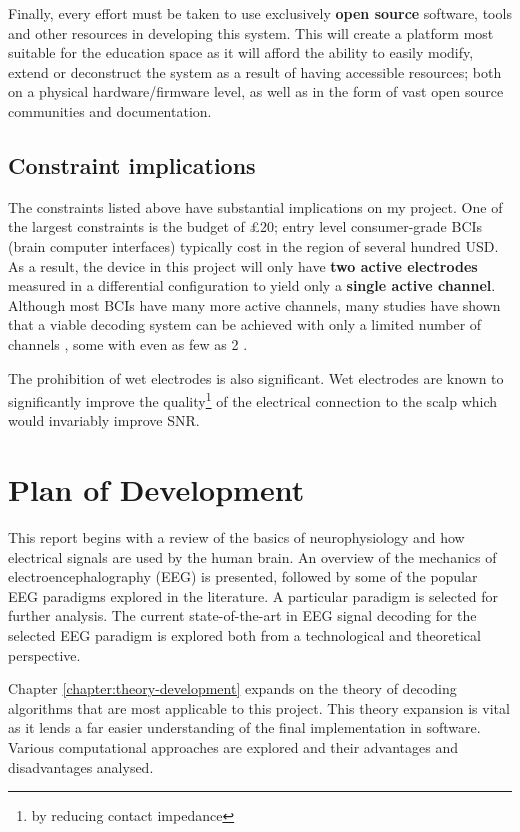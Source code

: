 Finally, every effort must be taken to use exclusively \textbf{open source} software, tools and other resources in developing this system. This will create a platform most suitable for the education space as it will afford the ability to easily modify, extend or deconstruct the system as a result of having accessible resources; both on a physical hardware/firmware level, as well as in the form of vast open source communities and documentation.

\subsection{Constraint implications}
The constraints listed above have substantial implications on my project. One of the largest constraints is the budget of £20; entry level consumer-grade BCIs (brain computer interfaces) typically cost in the region of several hundred USD. As a result, the device in this project will only have \textbf{two active electrodes} measured in a differential configuration to yield only a \textbf{single active channel}. Although most BCIs have many more active channels, many studies have shown that a viable decoding system can be achieved with only a limited number of channels \cite{Wang2011}, some with even as few as 2 \cite{acampora-dataset}. 

The prohibition of wet electrodes is also significant. Wet electrodes are known to significantly improve the quality\footnote{by reducing contact impedance} of the electrical connection to the scalp which would invariably improve SNR. 
\section{Plan of Development}
This report begins with a review of the basics of neurophysiology and how electrical signals are used by the human brain. An overview of the mechanics of electroencephalography (EEG) is presented, followed by some of the popular EEG paradigms explored in the literature. A particular paradigm is selected for further analysis. The current state-of-the-art in EEG signal decoding for the selected EEG paradigm is explored both from a technological and theoretical perspective. 

Chapter \ref{chapter:theory-development} expands on the theory of decoding algorithms that are most applicable to this project. This theory expansion is vital as it lends a far easier understanding of the final implementation in software. Various computational approaches are explored and their advantages and disadvantages analysed. 


